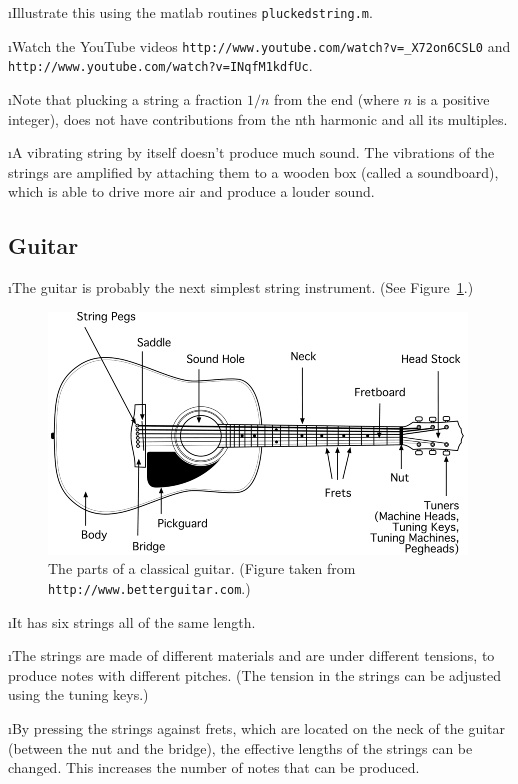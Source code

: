 \i \demo Illustrate this using the matlab
routines {\tt pluckedstring.m}.

\i \demo Watch the YouTube videos
{\tt http://www.youtube.com/watch?v=\_X72on6CSL0}
and\\
{\tt  http://www.youtube.com/watch?v=INqfM1kdfUc}.

\i Note that plucking a string a fraction $1/n$ from the
end (where $n$ is a positive integer), does not have 
contributions from the nth harmonic and all its multiples.

\i A vibrating string by itself doesn't produce much 
sound.
The vibrations of the strings are amplified by
attaching them to a wooden box (called a soundboard), 
which is able to drive more air and produce a louder sound.

\ei
\subsection{Guitar}
\bi

\i The guitar is probably the next simplest string
instrument.
(See Figure~\ref{f:guitar}.)
%
\begin{figure}[htbp]
\begin{center}
\includegraphics[width=.9\textwidth]{guitar.jpg}
\caption{The parts of a classical guitar.
(Figure taken from {\tt http://www.betterguitar.com}.)}
\label{f:guitar}
\end{center}
\end{figure}

\i It has six strings all of the same length.

\i The strings are made of different materials 
and are under different tensions, to produce notes 
with different pitches.
(The tension in the strings can be adjusted 
using the tuning keys.)

\i By pressing the strings against frets, which
are located on the neck of the guitar (between the
nut and the bridge), the effective lengths of 
the strings can be changed.
This increases the number of notes that can be 
produced.

